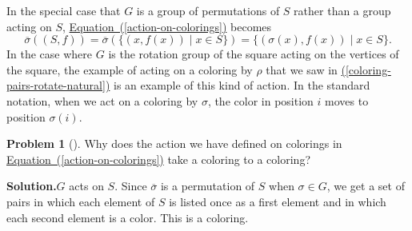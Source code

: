 \documentclass[10pt,]{book}
\theoremstyle{plain}
\theoremstyle{definition}
\newtheorem{activity}[project]{Problem}
\theoremstyle{definition}
\numberwithin{equation}{chapter}
\begin{document}
\par
In the special case that \(G\) is a group of permutations of \(S\) rather than a group acting on \(S\), \hyperref[action-on-colorings]{Equation~(\ref{action-on-colorings})} becomes%
\begin{equation*}
\overline{\sigma}((S,f)) = \overline{\sigma}(\{(x,f(x))\mid x\in S\}) = \{(\sigma(x),f(x))\mid x\in S\}\text{.}
\end{equation*}
In the case where \(G\) is the rotation group of the square acting on the vertices of the square, the example of acting on a coloring by \(\rho\) that we saw in \hyperref[coloring-pairs-rotate-natural]{(\ref{coloring-pairs-rotate-natural})} is an example of this kind of action. In the standard notation, when we act on a coloring by \(\sigma\), the color in position \(i\) moves to position \(\sigma(i)\).%
\begin{activity}[]\label{coloring-to-coloring}
Why does the action we have defined on colorings in \hyperref[action-on-colorings]{Equation~(\ref{action-on-colorings})} take a coloring to a coloring?%
\par\medskip\noindent%
\textbf{Solution.}\quad \(G\) acts on \(S\). Since \(\overline{\sigma}\) is a permutation of \(S\) when \(\sigma\in G\), we get a set of pairs in which each element of \(S\) is listed once as a first element and in which each second element is a color. This is a coloring.%
\end{activity}
\end{document}
